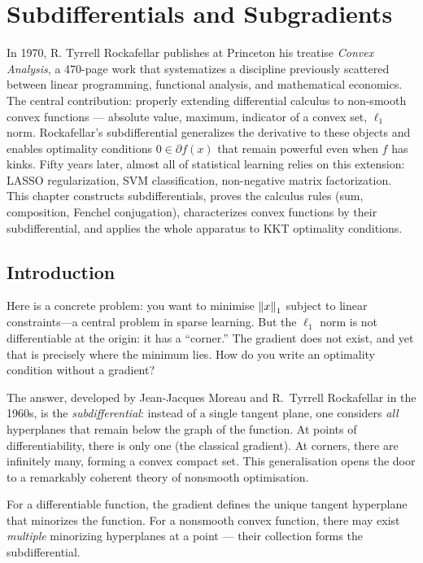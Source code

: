 \chapter{Subdifferentials and Subgradients}
\label{ch:subdifferentials}

In 1970, R. Tyrrell Rockafellar publishes at Princeton his treatise \emph{Convex Analysis}, a 470-page work that systematizes a discipline previously scattered between linear programming, functional analysis, and mathematical economics. The central contribution: properly extending differential calculus to non-smooth convex functions --- absolute value, maximum, indicator of a convex set, $\ell_1$ norm. Rockafellar's subdifferential generalizes the derivative to these objects and enables optimality conditions $0 \in \partial f(x)$ that remain powerful even when $f$ has kinks. Fifty years later, almost all of statistical learning relies on this extension: LASSO regularization, SVM classification, non-negative matrix factorization. This chapter constructs subdifferentials, proves the calculus rules (sum, composition, Fenchel conjugation), characterizes convex functions by their subdifferential, and applies the whole apparatus to KKT optimality conditions.

\section{Introduction}

Here is a concrete problem: you want to minimise $\left\| x \right\|_1$ subject to linear constraints---a central problem in sparse learning. But the $\ell_1$ norm is not differentiable at the origin: it has a ``corner.'' The gradient does not exist, and yet that is precisely where the minimum lies. How do you write an optimality condition without a gradient?

The answer, developed by Jean-Jacques Moreau and R.~Tyrrell Rockafellar in the 1960s, is the \emph{subdifferential}: instead of a single tangent plane, one considers \emph{all} hyperplanes that remain below the graph of the function. At points of differentiability, there is only one (the classical gradient). At corners, there are infinitely many, forming a convex compact set. This generalisation opens the door to a remarkably coherent theory of nonsmooth optimisation.

\begin{intuition}
For a differentiable function, the gradient defines the unique tangent hyperplane that
minorizes the function. For a nonsmooth convex function, there may exist \emph{multiple}
minorizing hyperplanes at a point --- their collection forms the subdifferential.
\end{intuition}

